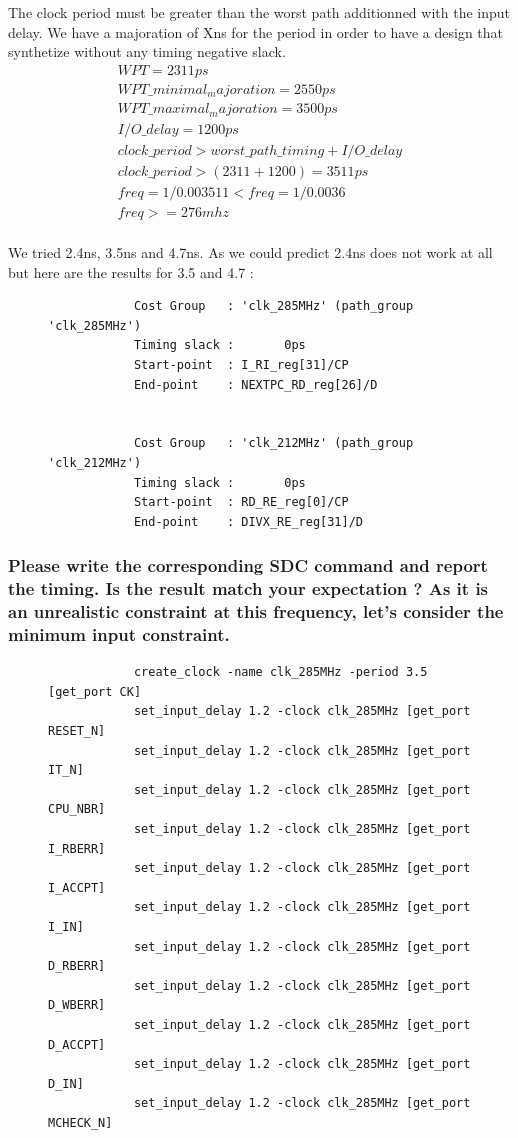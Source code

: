 \documentclass[11pt,a4paper,sans,dvipsnames]{report}
\begin{document}
	The clock period must be greater than the worst path additionned with the input delay. We have a majoration of Xns for the period in order to have a design that synthetize without any timing negative slack.
	\begin{gather}
		WPT = 2311 ps\\
		WPT\_minimal_majoration = 2550 ps\\
		WPT\_maximal_majoration = 3500ps\\
		I/O\_delay = 1200 ps\\
		clock\_period > worst\_path\_timing + I/O\_delay\\
		clock\_period > (2311+1200) = 3511 ps\\
		freq = 1 / 0.003511 < freq = 1 / 0.0036 \\
		freq >= 276mhz\\
	\end{gather}

	We tried 2.4ns, 3.5ns and 4.7ns. As we could predict 2.4ns does not work at all but here are the results for 3.5 and 4.7 :

	\begin{figure}[h!]
		\centering
		\begin{lstlisting}
			Cost Group   : 'clk_285MHz' (path_group 'clk_285MHz')
			Timing slack :       0ps 
			Start-point  : I_RI_reg[31]/CP
			End-point    : NEXTPC_RD_reg[26]/D


			Cost Group   : 'clk_212MHz' (path_group 'clk_212MHz')
			Timing slack :       0ps 
			Start-point  : RD_RE_reg[0]/CP
			End-point    : DIVX_RE_reg[31]/D
		\end{lstlisting}

	\end{figure}

	\subsubsection*{Please write the corresponding SDC command and report the timing. Is the result match your expectation ? As it is an unrealistic constraint at this frequency, let's consider the minimum input constraint.}
	\begin{figure}[h!]
		\centering
		\begin{lstlisting}
			create_clock -name clk_285MHz -period 3.5 [get_port CK]
			set_input_delay 1.2 -clock clk_285MHz [get_port RESET_N]
			set_input_delay 1.2 -clock clk_285MHz [get_port IT_N]
			set_input_delay 1.2 -clock clk_285MHz [get_port CPU_NBR]
			set_input_delay 1.2 -clock clk_285MHz [get_port I_RBERR]
			set_input_delay 1.2 -clock clk_285MHz [get_port I_ACCPT]
			set_input_delay 1.2 -clock clk_285MHz [get_port I_IN]
			set_input_delay 1.2 -clock clk_285MHz [get_port D_RBERR]
			set_input_delay 1.2 -clock clk_285MHz [get_port D_WBERR]
			set_input_delay 1.2 -clock clk_285MHz [get_port D_ACCPT]
			set_input_delay 1.2 -clock clk_285MHz [get_port D_IN]
			set_input_delay 1.2 -clock clk_285MHz [get_port MCHECK_N]
		\end{lstlisting}
		\label{fig:constraints_input}
	\end{figure}
\end{document}
